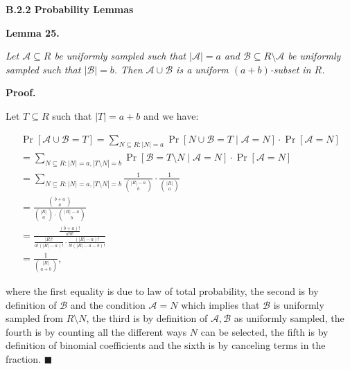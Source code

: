 \documentclass[10pt,a4paper]{article}
\begin{document}
\par\medskip\noindent\textbf{B.2.2 Probability Lemmas}\par





\par\medskip\noindent\textbf{\textbf{Lemma 25}\textbf{.}}\par



\emph{Let $\mathcal{A}\subseteq R$ be uniformly sampled such that $|\mathcal{A}|=a$ and $\mathcal{B}\subseteq R\setminus\mathcal{A}$ be uniformly sampled such that $|\mathcal{B}|=b$.
Then $\mathcal{A}\cup\mathcal{B}$ is a uniform $(a+b)$-subset in $R$.}\par






\par\medskip\noindent\textbf{Proof.}\par



Let $T\subseteq R$ such that $|T|=a+b$ and we have:\par


\[\begin{gathered}
\displaystyle\Pr[\mathcal{A}\cup\mathcal{B}=T] \displaystyle=\sum_{N\subseteq R:|N|=a}\Pr[N\cup\mathcal{B}=T\mid\mathcal{A}=N]\cdot\Pr[\mathcal{A}=N] \\
\displaystyle=\sum_{N\subseteq R:|N|=a,|T\setminus N|=b}\Pr[\mathcal{B}=T\setminus N\mid\mathcal{A}=N]\cdot\Pr[\mathcal{A}=N] \\
\displaystyle=\sum_{N\subseteq R:|N|=a,|T\setminus N|=b}\frac{1}{\binom{|R|-a}{b}}\cdot\frac{1}{\binom{|R|}{a}} \\
\displaystyle=\frac{\binom{b+a}{a}}{\binom{|R|}{a}\cdot\binom{|R|-a}{b}} \\
\displaystyle=\frac{\frac{(b+a)!}{a!b!}}{\frac{|R|!}{a!(|R|-a)!}\cdot\frac{(|R|-a)!}{b!(|R|-a-b)!}} \\
\displaystyle=\frac{1}{\binom{|R|}{a+b}},
\end{gathered}\]


where the first equality is due to law of total probability, the second is by definition of $\mathcal{B}$ and the condition $\mathcal{A}=N$ which implies that $\mathcal{B}$ is uniformly sampled from $R\setminus N$, the third is by definition of $\mathcal{A},\mathcal{B}$ as uniformly sampled, the fourth is by counting all the different ways $N$ can be selected, the fifth is by definition of binomial coefficients and the sixth is by canceling terms in the fraction.
\ensuremath{\blacksquare}\par
\end{document}
